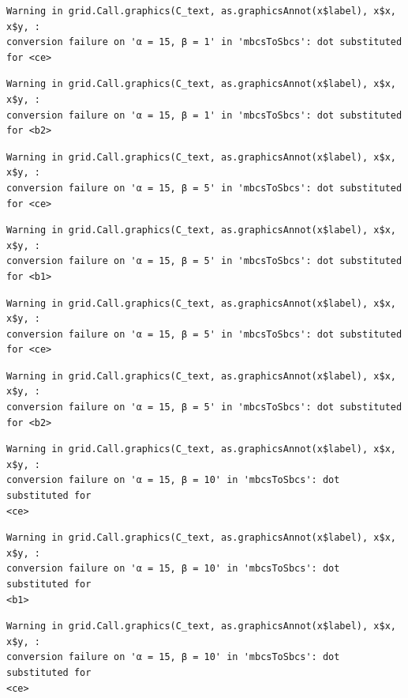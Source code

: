 \documentclass[
  spanish,
  a4paper,
]{scrreport}
\theoremstyle{plain}
\theoremstyle{definition}
\theoremstyle{definition}
\theoremstyle{remark}
\begin{document}
\begin{verbatim}
Warning in grid.Call.graphics(C_text, as.graphicsAnnot(x$label), x$x, x$y, :
conversion failure on 'α = 15, β = 1' in 'mbcsToSbcs': dot substituted for <ce>
\end{verbatim}

\begin{verbatim}
Warning in grid.Call.graphics(C_text, as.graphicsAnnot(x$label), x$x, x$y, :
conversion failure on 'α = 15, β = 1' in 'mbcsToSbcs': dot substituted for <b2>
\end{verbatim}

\begin{verbatim}
Warning in grid.Call.graphics(C_text, as.graphicsAnnot(x$label), x$x, x$y, :
conversion failure on 'α = 15, β = 5' in 'mbcsToSbcs': dot substituted for <ce>
\end{verbatim}

\begin{verbatim}
Warning in grid.Call.graphics(C_text, as.graphicsAnnot(x$label), x$x, x$y, :
conversion failure on 'α = 15, β = 5' in 'mbcsToSbcs': dot substituted for <b1>
\end{verbatim}

\begin{verbatim}
Warning in grid.Call.graphics(C_text, as.graphicsAnnot(x$label), x$x, x$y, :
conversion failure on 'α = 15, β = 5' in 'mbcsToSbcs': dot substituted for <ce>
\end{verbatim}

\begin{verbatim}
Warning in grid.Call.graphics(C_text, as.graphicsAnnot(x$label), x$x, x$y, :
conversion failure on 'α = 15, β = 5' in 'mbcsToSbcs': dot substituted for <b2>
\end{verbatim}

\begin{verbatim}
Warning in grid.Call.graphics(C_text, as.graphicsAnnot(x$label), x$x, x$y, :
conversion failure on 'α = 15, β = 10' in 'mbcsToSbcs': dot substituted for
<ce>
\end{verbatim}

\begin{verbatim}
Warning in grid.Call.graphics(C_text, as.graphicsAnnot(x$label), x$x, x$y, :
conversion failure on 'α = 15, β = 10' in 'mbcsToSbcs': dot substituted for
<b1>
\end{verbatim}

\begin{verbatim}
Warning in grid.Call.graphics(C_text, as.graphicsAnnot(x$label), x$x, x$y, :
conversion failure on 'α = 15, β = 10' in 'mbcsToSbcs': dot substituted for
<ce>
\end{verbatim}
\end{document}
